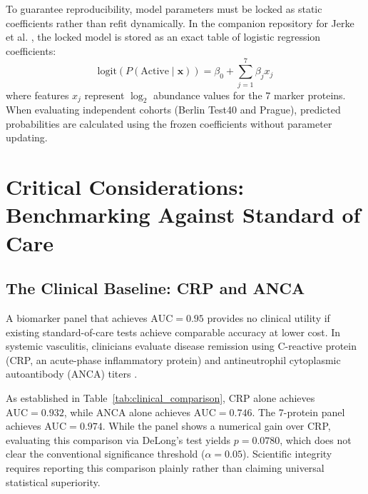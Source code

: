 \documentclass[11pt,twoside,openright]{book}
\begin{document}
To guarantee reproducibility, model parameters must be locked as static coefficients rather than refit dynamically. In the companion repository for Jerke et al. \cite{jerke2026vasculitis}, the locked model is stored as an exact table of logistic regression coefficients:
\begin{equation}
\text{logit}(P(\text{Active} \mid \mathbf{x})) = \beta_0 + \sum_{j=1}^{7} \beta_j x_j
\label{eq:locked_glm}
\end{equation}
where features $x_j$ represent $\log_2$ abundance values for the 7 marker proteins. When evaluating independent cohorts (Berlin Test40 and Prague), predicted probabilities are calculated using the frozen coefficients without parameter updating.

\section{Critical Considerations: Benchmarking Against Standard of Care}

\subsection{The Clinical Baseline: CRP and ANCA}

A biomarker panel that achieves $\text{AUC} = 0.95$ provides no clinical utility if existing standard-of-care tests achieve comparable accuracy at lower cost. In systemic vasculitis, clinicians evaluate disease remission using C-reactive protein (CRP, an acute-phase inflammatory protein) and antineutrophil cytoplasmic autoantibody (ANCA) titers \cite{jerke2026vasculitis}.

As established in Table~\ref{tab:clinical_comparison}, CRP alone achieves $\text{AUC} = 0.932$, while ANCA alone achieves $\text{AUC} = 0.746$. The 7-protein panel achieves $\text{AUC} = 0.974$. While the panel shows a numerical gain over CRP, evaluating this comparison via DeLong's test yields $p = 0.0780$, which does not clear the conventional significance threshold ($\alpha = 0.05$). Scientific integrity requires reporting this comparison plainly rather than claiming universal statistical superiority.
\end{document}
